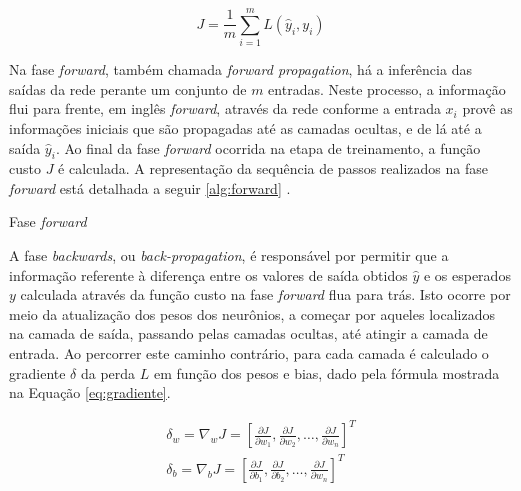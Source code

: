 \begin{equation}\label{eq:custo}
J = \frac{1}{m} \sum_{i=1}^{m} L(\hat{y}_{i}, y_{i})
\end{equation}

Na fase \emph{forward}, também chamada \emph{forward propagation}, há a inferência das saídas da rede perante um conjunto de $m$ entradas. Neste processo, a informação flui para frente, em inglês \emph{forward}, através da rede conforme a entrada $x_i$ provê as informações iniciais que são propagadas até as camadas ocultas, e de lá até a saída $\hat{y}_i$. Ao final da fase \emph{forward} ocorrida na etapa de treinamento, a função custo $J$ é calculada. A representação da sequência de passos realizados na fase \emph{forward} está detalhada a seguir \ref{alg:forward} \cite{haykin2009neural, goodfellow2016deep}.

\begin{algorithm}\label{alg:forward}
	\caption{Fase \emph{forward}}
\end{algorithm}

A fase \emph{backwards}, ou \emph{back-propagation}, é responsável por permitir que a informação referente à diferença entre os valores de saída obtidos $\hat{y}$ e os esperados $y$ calculada através da função custo na fase \emph{forward} flua para trás. Isto ocorre por meio da atualização dos pesos dos neurônios, a começar por aqueles localizados na camada de saída, passando pelas camadas ocultas, até atingir a camada de entrada. Ao percorrer este caminho contrário, para cada camada é calculado o gradiente $\delta$ da perda $L$ em função dos pesos e bias, dado pela fórmula mostrada na Equação \ref{eq:gradiente}.

\begin{gather}\label{eq:gradiente}
	\delta_w = \nabla_{w} J = \left[
							\frac{\partial J}{\partial w_1}, \frac{\partial J}{\partial w_2}, \ldots, \frac{\partial J}{\partial w_n}
						\right]^T\\
	\delta_b = \nabla_{b} J = \left[
							\frac{\partial J}{\partial b_1}, \frac{\partial J}{\partial b_2}, \ldots, \frac{\partial J}{\partial w_n}
						\right]^T
\end{gather}

